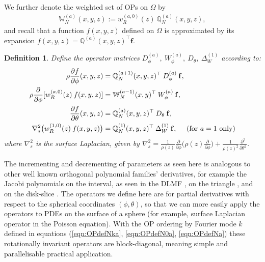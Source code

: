 \documentclass[11pt, oneside]{article}   	%
\newcommand{\genjac}{R}
\newcommand{\genjacw}{w_\genjac}
\newcommand{\bigW}{\mathbb{W}}
\newcommand{\bigscop}{{\mathbb{Q}}}
\newcommand{\bigscopa}{\bigscop^{(a)}}
\newcommand{\bigscopN}{\bigscop_{N}}
\newcommand{\bigscopNa}{\bigscopa_{N}}
\newcommand{\bigWNa}{\mathbb{W}_N^{(a)}}
\newcommand{\ppphi}{\frac{\partial}{\partial \phi}}
\newcommand{\rhozppphi}{\rho(z) \ppphi}
\newcommand{\ppthetatwo}{\frac{\partial^2}{\partial \theta^2}}
\newtheorem{definition}{Definition}
\begin{document}
We further denote the weighted set of OPs on $\Omega$ by 
\begin{align*}
	\bigWNa(x,y,z) := \genjacw^{(a,0)}(z) \: \bigscopNa(x,y,z),
\end{align*}
and recall that a function $f(x,y,z)$ defined on $\Omega$ is approximated by its expansion $f(x,y,z) = \bigscopa(x,y,z)^\top \mathbf{f}$.

\begin{definition}\label{def:differentialoperators}
Define the operator matrices $D_\phi^{(a)}, \: W_\phi^{(a)}, \: D_\theta, \: \Delta^{(1)}_W$ according to:
\begin{align*}
	\rho {\partial f \over \partial \phi}(x,y,z)&= \bigscop_N^{(a+1)}(x,y,z)^\top \: D_\phi^{(a)} \: \mathbf{f}, \\
	\rho {\partial \over \partial \phi}[\genjacw^{(a,0)}(z) \: f(x,y,z)] &= \bigW_N^{(a-1)}(x,y)^\top \: W_\phi^{(a)}\: \mathbf{f}, \\
	{\partial f \over \partial \theta}(x,y,z) &= \bigscopNa(x,y,z)^\top \: D_\theta \: \mathbf{f}, \\
	\nabla^2_s \big( \genjacw^{(1,0)}(z) \: f(x,y,z) \big) &= \bigscopN^{(1)}(x,y,z)^\top \: \Delta^{(1)}_W \: \mathbf{f}, \quad \text{ (for } a = 1 \text{ only)}
\end{align*}
where $\nabla^2_s$ is the surface Laplacian, given by $\nabla^2_s = \frac{1}{\rho(z)} \ppphi \big( \rhozppphi \big) + \frac{1}{\rho(z)^2} \ppthetatwo$.
\end{definition}

The incrementing and decrementing of parameters as seen here is analogous to other well known orthogonal polynomial families' derivatives, for example the Jacobi polynomials on the interval, as seen in the DLMF \cite[(18.9.3)]{DLMF}, on the triangle \cite{olver2018recurrence}, and on the disk-slice \cite{snowball2019sparse}. The operators we define here are for partial derivatives with respect to the spherical coordinates $(\phi, \theta)$, so that we can more easily apply the operators to PDEs on the surface of a sphere (for example, surface Laplacian operator in the Poisson equation). With the OP ordering by Fourier mode $k$ defined in equations (\ref{eqn:OPdefNka}, \ref{eqn:OPdefN0a}, \ref{eqn:OPdefNa}) these rotationally invariant operators are block-diagonal, meaning simple and parallelisable practical application.
\end{document}
